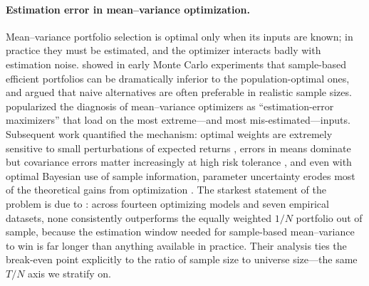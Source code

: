 \documentclass[11pt]{article}
\newcommand{\TN}{T/N}
\begin{document}
\paragraph{Estimation error in mean--variance optimization.}
Mean--variance portfolio selection \citep{markowitz1952portfolio} is optimal
only when its inputs are known; in practice they must be estimated, and the
optimizer interacts badly with estimation noise. \citet{jobson1980estimation}
showed in early Monte Carlo experiments that sample-based efficient
portfolios can be dramatically inferior to the population-optimal ones, and
\citet{jobson1981putting} argued that naive alternatives are often preferable
in realistic sample sizes. \citet{michaud1989markowitz} popularized the
diagnosis of mean--variance optimizers as ``estimation-error maximizers''
that load on the most extreme---and most mis-estimated---inputs. Subsequent
work quantified the mechanism: optimal weights are extremely sensitive to
small perturbations of expected returns \citep{best1991sensitivity}, errors
in means dominate but covariance errors matter increasingly at high risk
tolerance \citep{chopra1993effect}, and even with optimal Bayesian use of
sample information, parameter uncertainty erodes most of the theoretical
gains from optimization \citep{kan2007optimal}. The starkest statement of the
problem is due to \citet{demiguel2009optimal}: across fourteen optimizing
models and seven empirical datasets, none consistently outperforms the
equally weighted $1/N$ portfolio out of sample, because the estimation window
needed for sample-based mean--variance to win is far longer than anything
available in practice. Their analysis ties the break-even point explicitly to
the ratio of sample size to universe size---the same $\TN$ axis we stratify
on.
\end{document}
